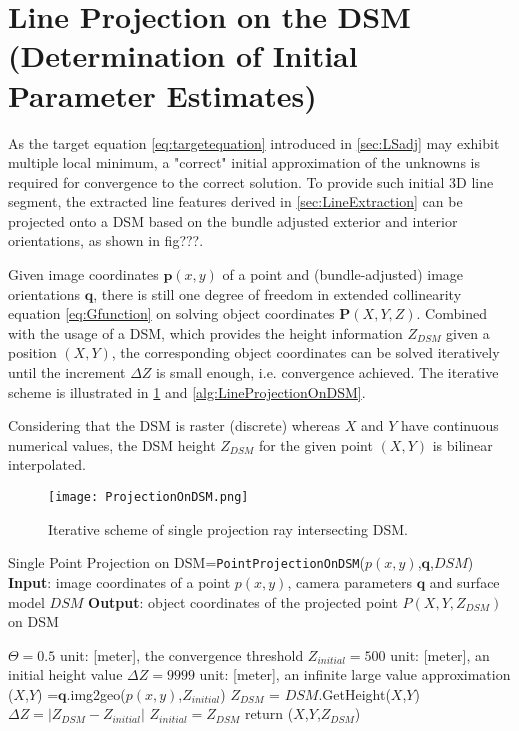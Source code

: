 \section{Line Projection on the DSM (Determination of Initial Parameter Estimates)}
\label{sec:LineProjectionOnDSM}

As the target equation \ref{eq:targetequation} introduced in \cref{sec:LSadj} may exhibit multiple local minimum, a "correct" initial approximation of the unknowns is required for convergence to the correct solution. To provide such initial 3D line segment, the extracted line features derived in \cref{sec:LineExtraction} can be projected onto a DSM based on the bundle adjusted exterior and interior orientations, as shown in fig???.


Given image coordinates $\mathbf{p}(x,y)$ of a point and (bundle-adjusted) image orientations $\mathbf{q}$, there is still one degree of freedom in extended collinearity equation \eqref{eq:Gfunction} on solving object coordinates $\mathbf{P}(X,Y,Z)$. Combined with the usage of a DSM, which provides the height information $Z_{DSM}$ given a position $(X,Y)$, the corresponding object coordinates can be solved iteratively until the increment $\Delta Z$ is small enough, i.e. convergence achieved. The iterative scheme is illustrated in \cref{fig:ProjectiononDSM} and \cref{alg:LineProjectionOnDSM}.

Considering that the DSM is raster (discrete) whereas $X$ and $Y$ have continuous numerical values, the DSM height $Z_{DSM}$ for the given point $(X,Y)$ is bilinear interpolated.

\begin{figure}%
	\centering
	\texttt{[image: ProjectionOnDSM.png]}
	\caption{\small Iterative scheme of single projection ray intersecting DSM.}
	\label{fig:ProjectiononDSM}
\end{figure}

\begin{Algorithmus}
\caption{Single Point Projection on DSM\newline
	[$X$,$Y$,$Z_{DSM}$]=\texttt{PointProjectionOnDSM}($p(x,y)$,$\mathbf{q}$,$DSM$)\newline
	\textbf{Input}: image coordinates of a point $p(x,y)$, 
					camera parameters $\mathbf{q}$ and
					surface model $DSM$\newline
	\textbf{Output}: object coordinates of the projected point $P(X,Y,Z_{DSM})$ on DSM
}
\label{alg:LineProjectionOnDSM}
\begin{algorithmic}
\State $\Theta=0.5$
\Comment unit: [meter], the convergence threshold
\State $Z_{initial}=500$
\Comment unit: [meter], an initial height value
\State $\Delta Z=9999$
\Comment unit: [meter], an infinite large value approximation
	\State ($X$,$Y$) =$\mathbf{q}$.img2geo($p(x,y)$,$Z_{initial}$)
	\State $Z_{DSM}$ = $DSM$.GetHeight($X$,$Y$)
	\State $\Delta Z=|Z_{DSM}-Z_{initial}|$
	\State $Z_{initial}=Z_{DSM}$
\EndWhile
\State return ($X$,$Y$,$Z_{DSM}$)

\end{algorithmic}
\end{Algorithmus}

